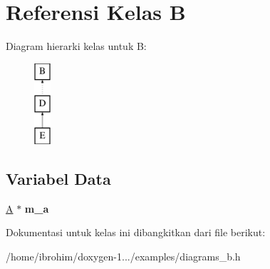 \hypertarget{classB}{}\section{Referensi Kelas B}
\label{classB}
Diagram hierarki kelas untuk B\+:\begin{figure}[H]
\begin{center}
\leavevmode
\includegraphics[height=3.000000cm]{d3/d1a/classB}
\end{center}
\end{figure}
\subsection*{Variabel Data}
\begin{DoxyCompactItemize}
\item 
\hypertarget{classB_a26c70b64fe7cf17fcced7755ecff7537}{}\hyperlink{classA}{A} $\ast$ {\bfseries m\+\_\+a}\label{classB_a26c70b64fe7cf17fcced7755ecff7537}

\end{DoxyCompactItemize}


Dokumentasi untuk kelas ini dibangkitkan dari file berikut\+:\begin{DoxyCompactItemize}
\item 
/home/ibrohim/doxygen-\/1.../examples/diagrams\+\_\+b.\+h\end{DoxyCompactItemize}
